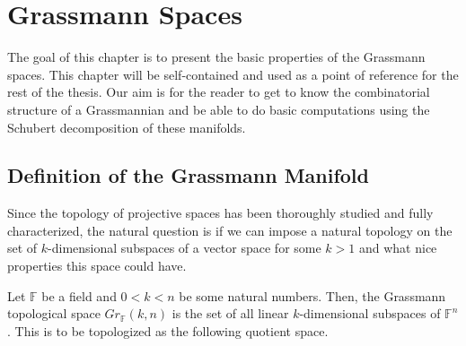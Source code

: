 \chapter{Grassmann Spaces}
The goal of this chapter is to present the basic properties of the Grassmann spaces. This chapter will be self-contained and used as a point of reference for the rest of the thesis. Our aim is for the reader to get to know the combinatorial structure of a Grassmannian and be able to do basic computations using the Schubert decomposition of these manifolds.
\section{Definition of the Grassmann Manifold}
Since the topology of projective spaces has been thoroughly studied and fully characterized, the natural question is if we can impose a natural topology on the set of $k$-dimensional subspaces of a vector space for some $k>1$ and what nice properties this space could have.

\begin{definition} Let $\mathbb{F}$ be a field and $0<k<n$ be some natural numbers. Then, the Grassmann topological space $Gr_{\mathbb{F}}(k,n)$ is the set of all linear $k$-dimensional subspaces of $\mathbb{F}^n$. This is to be topologized as the following quotient space.\end{definition}




